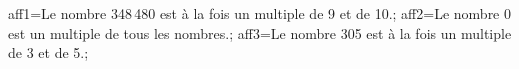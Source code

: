 \documentclass[exercice]{thedocument}%
\begin{document}
%
\>aff1=Le nombre 348\,480 est à la fois un multiple de 9 et de 10.;%
\>aff2=Le nombre 0 est un multiple de tous les nombres.;%
\>aff3=Le nombre 305 est à la fois un multiple de 3 et de 5.;%
%
\end{document}

